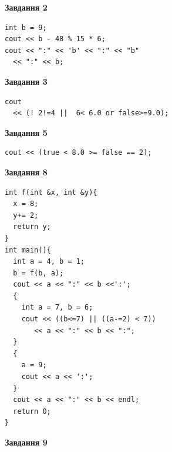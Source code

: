 \documentclass[12pt, ukrainian]{article}
\begin{document}
{\begin {large}
\begin{minipage}[t]{7.0cm}
\end{minipage}
\vline \hspace{1mm}
\begin{minipage}[t]{11.0cm}

\begin{center}
\textbf{Завдання 2}
\end{center}
\vspace{-8mm}

\begin{verbatim}
int b = 9;
cout << b - 48 % 15 * 6;
cout << ":" << 'b' << ":" << "b" 
  << ":" << b;
\end{verbatim}



\begin{center}
\textbf{Завдання 3}
\end{center}
\vspace{-8mm}

\begin{verbatim}
cout 
  << (! 2!=4 ||  6< 6.0 or false>=9.0);
\end{verbatim}



\begin{center}
\textbf{Завдання 5}
\end{center}
\vspace{-8mm}

\begin{verbatim}
cout << (true < 8.0 >= false == 2);
\end{verbatim}



\begin{center}
\textbf{Завдання 8}
\end{center}
\vspace{-8mm}

\begin{verbatim}
int f(int &x, int &y){
  x = 8;
  y+= 2;
  return y;
}
int main(){
  int a = 4, b = 1;
  b = f(b, a);
  cout << a << ":" << b <<':';
  {
    int a = 7, b = 6;
    cout << ((b<=7) || ((a-=2) < 7))
       << a << ":" << b << ":";
  }
  {
    a = 9;
    cout << a << ':';
  }
  cout << a << ":" << b << endl;
  return 0;
}
\end{verbatim}

\end{minipage}


\begin{minipage}[t]{7.0cm}

\begin{center}
\textbf{Завдання 9}
\end{center}
\vspace{-8mm}


\end{minipage}
\end{large}}
\end{document}
